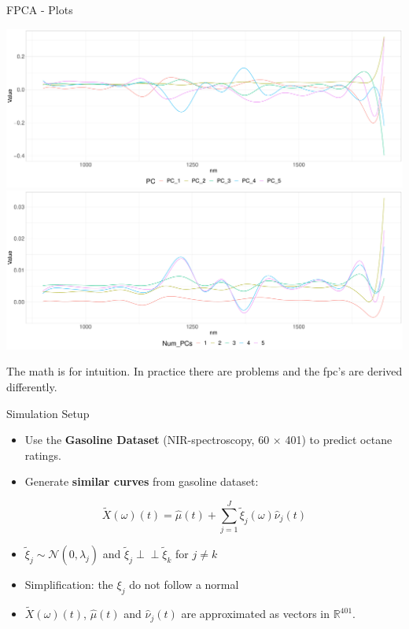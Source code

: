 \documentclass{beamer}
\newcommand{\independent}{\perp\!\!\!\!\perp}
\begin{document}
	\begin{frame}{FPCA - Plots}
		\begin{minipage}[c]{0.78\textwidth}
			\includegraphics[width = \textwidth]{../Graphics/principal_components.pdf}
			\includegraphics[width = \textwidth]{../Graphics/pc_approx.pdf}
		\end{minipage}
		\begin{minipage}[c]{0.19\textwidth}
			The math is for intuition. In practice there are problems and the fpc's are derived differently.
		\end{minipage}
	\end{frame}
	

	\begin{frame}{Simulation Setup}
		\begin{itemize}
			\item Use the \textbf{Gasoline Dataset} (NIR-spectroscopy, 60 $\times$ 401) to predict octane ratings.
			\item Generate \textbf{similar curves} from gasoline dataset:
		\end{itemize}
	
		$$\tilde{X}(\omega)(t) = \hat{\mu}(t) + \sum_{j = 1}^{J} \tilde{\xi}_j(\omega) \hat{\nu}_j(t)$$ 

		\begin{itemize}
			\item $\tilde{\xi}_{j} \sim \mathcal{N}(0,\hat{\lambda}_j)$ and $\tilde{\xi}_{j} \independent \tilde{\xi}_{k}$ for $j \neq k$
			\item Simplification: the $\xi_{j}$ do not follow a normal
			\item $\tilde{X}(\omega)(t)$, $\hat{\mu}(t)$ and $\hat{\nu}_j(t)$ are approximated as vectors in $\mathbb{R}^{401}$.
		\end{itemize}
		
	\end{frame}
	
\end{document}
